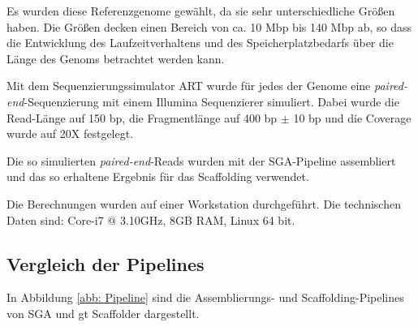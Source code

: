 \documentclass[a4paper,10pt,parskip]{scrartcl}
\begin{document}
Es wurden diese Referenzgenome gewählt, da sie sehr unterschiedliche
Größen haben. Die Größen decken einen Bereich von ca. 10 Mbp bis 140
Mbp ab, so dass die Entwicklung des Laufzeitverhaltens und des
Speicherplatzbedarfs über die Länge des Genoms betrachtet werden kann.

Mit dem Sequenzierungssimulator ART \cite{Huang:2012kq} wurde für jedes
der Genome eine \textit{paired-end}-Sequenzierung mit einem Illumina
Sequenzierer simuliert. Dabei wurde die Read-Länge auf 150 bp, die
Fragmentlänge auf 400 bp $\pm$ 10 bp und die Coverage wurde auf 20X
festgelegt.

Die so simulierten \textit{paired-end}-Reads wurden mit der
SGA-Pipeline assembliert und das so erhaltene Ergebnis für das
Scaffolding verwendet.

Die Berechnungen wurden auf einer Workstation durchgeführt. Die
technischen Daten sind: Core-i7 @ 3.10GHz, 8GB RAM, Linux 64 bit.

\subsection{Vergleich der Pipelines}

In Abbildung \ref{abb: Pipeline} sind die Assemblierungs- und
Scaffolding-Pipelines von SGA und gt Scaffolder dargestellt.
\end{document}
